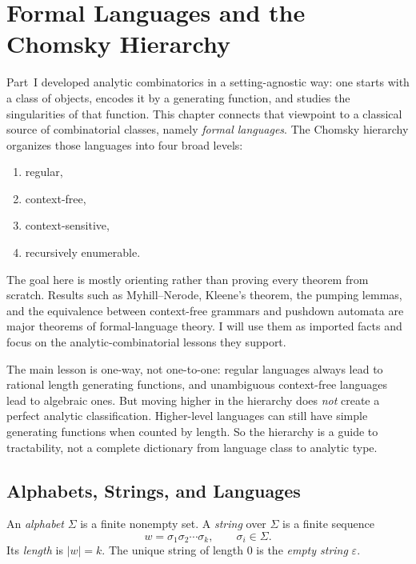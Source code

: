 \chapter{Formal Languages and the Chomsky Hierarchy}

Part~I developed analytic combinatorics in a setting-agnostic way: one starts with a class of objects, encodes it by a generating function, and studies the singularities of that function. This chapter connects that viewpoint to a classical source of combinatorial classes, namely \emph{formal languages}. The Chomsky hierarchy organizes those languages into four broad levels:
\begin{enumerate}
  \item regular,
  \item context-free,
  \item context-sensitive,
  \item recursively enumerable.
\end{enumerate}
The goal here is mostly orienting rather than proving every theorem from scratch. Results such as Myhill--Nerode, Kleene's theorem, the pumping lemmas, and the equivalence between context-free grammars and pushdown automata are major theorems of formal-language theory. I will use them as imported facts and focus on the analytic-combinatorial lessons they support.

The main lesson is one-way, not one-to-one: regular languages always lead to rational length generating functions, and unambiguous context-free languages lead to algebraic ones. But moving higher in the hierarchy does \emph{not} create a perfect analytic classification. Higher-level languages can still have simple generating functions when counted by length. So the hierarchy is a guide to tractability, not a complete dictionary from language class to analytic type.

\section{Alphabets, Strings, and Languages}

\begin{definition}
An \emph{alphabet} $\Sigma$ is a finite nonempty set. A \emph{string} over $\Sigma$ is a finite sequence
\[
  w = \sigma_1\sigma_2\cdots\sigma_k,
  \qquad \sigma_i \in \Sigma.
\]
Its \emph{length} is $|w|=k$. The unique string of length $0$ is the \emph{empty string} $\varepsilon$.
\end{definition}

